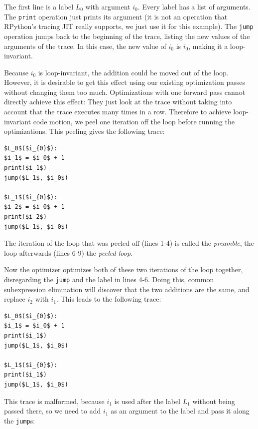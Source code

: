 \documentclass[preprint]{sigplanconf}
\begin{document}
The first line is a label $L_0$ with argument $i_0$. Every label has a list of
arguments. The \lstinline{print} operation just prints its argument (it is not
an operation that RPython's tracing JIT really supports, we just use it for this
example). The \lstinline{jump} operation jumps back to the beginning of the
trace, listing the new values of the arguments of the trace. In this case, the
new value of $i_0$ is $i_0$, making it a loop-invariant.

Because $i_0$ is loop-invariant, the addition could be moved out of the loop.
However, it is desirable to get this effect using our existing optimization passes
without changing them too much. Optimizations with one forward pass
cannot directly achieve this effect: They just look at the trace without taking
into account that the trace executes many times in a row. Therefore to achieve
loop-invariant code motion, we peel one iteration off the loop before running
the optimizations. This peeling gives the following trace:

\begin{lstlisting}[mathescape,numbers = right,basicstyle=\setstretch{1.05}\ttfamily\scriptsize]
$L_0$($i_{0}$):
$i_1$ = $i_0$ + 1
print($i_1$)
jump($L_1$, $i_0$)

$L_1$($i_{0}$):
$i_2$ = $i_0$ + 1
print($i_2$)
jump($L_1$, $i_0$)
\end{lstlisting}

The iteration of the loop that was peeled off (lines 1-4) is called the
\emph{preamble}, the loop afterwards (lines 6-9) the \emph{peeled loop}.

Now the optimizer optimizes both of these two iterations of the loop together,
disregarding the \lstinline{jump} and the label in lines 4-6. Doing this, common
subexpression elimination will discover that the two additions are the same, and
replace $i_2$ with $i_1$. This leads to the following trace:

\begin{lstlisting}[mathescape,numbers = right,basicstyle=\setstretch{1.05}\ttfamily\scriptsize]
$L_0$($i_{0}$):
$i_1$ = $i_0$ + 1
print($i_1$)
jump($L_1$, $i_0$)

$L_1$($i_{0}$):
print($i_1$)
jump($L_1$, $i_0$)
\end{lstlisting}

This trace is malformed, because $i_1$ is used after the label $L_1$ without
being passed there, so we need to add $i_1$ as an argument to the label and pass
it along the \lstinline{jump}s:
\end{document}
